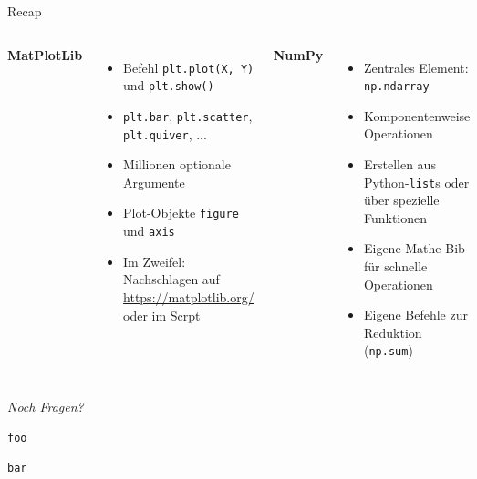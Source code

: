 
\begin{frame}[t,plain]
\titlepage
\end{frame}


\begin{frame}{Recap}
%
\begin{columns}[T]
\textbf{MatPlotLib}
\begin{itemize}
\item Befehl \texttt{plt.plot(X, Y)} und \texttt{plt.show()}
\item \texttt{plt.bar}, \texttt{plt.scatter}, \texttt{plt.quiver}, ...
\item Millionen optionale Argumente
\item Plot-Objekte \texttt{figure} und \texttt{axis}
\item Im Zweifel: Nachschlagen auf \url{https://matplotlib.org/} oder im Scrpt
\end{itemize}
%
\textbf{NumPy}
\begin{itemize}
\item Zentrales Element: \texttt{np.ndarray}
\item Komponentenweise Operationen
\item Erstellen aus Python-\texttt{list}s oder über spezielle Funktionen
\item Eigene Mathe-Bib für schnelle Operationen
\item Eigene Befehle zur Reduktion (\zB \texttt{np.sum})
\end{itemize}

\end{columns}
%
\begin{center}
	\emph{Noch Fragen?}
\end{center}
%
\end{frame}


\begin{frame}[fragile]
%
\begin{tcbraster}[raster columns=2,
                  raster equal height,
                  nobeforeafter,
                  raster column skip=0.5cm]
\begin{codebox}
\begin{verbatim}
foo
\end{verbatim}
\end{codebox}
%
\begin{codebox}
\begin{verbatim}
bar
\end{verbatim}
\end{codebox}
\end{tcbraster}
%
\end{frame}

